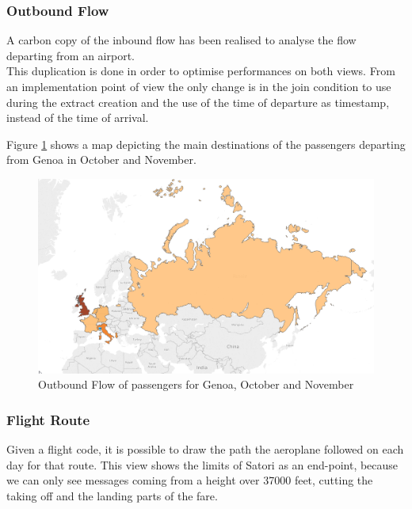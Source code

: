 \subsubsection{Outbound Flow}
A carbon copy of the inbound flow has been realised to analyse the flow departing from an airport.\\
This duplication is done in order to optimise performances on both views. From an implementation point of view the only change is in the join condition to use during the extract creation and the use of the time of departure as timestamp, instead of the time of arrival.

Figure \ref{fig:PassengersViz} shows a map depicting the main destinations of the passengers departing from Genoa in October and November.

\begin{figure}[h]
	\centering
	\includegraphics[width=0.9\linewidth]{Figures/PassengersViz.png}
	\caption{Outbound Flow of passengers for Genoa, October and November}
	\label{fig:PassengersViz}
\end{figure}

\subsubsection{Flight Route}
Given a flight code, it is possible to draw the path the aeroplane followed on each day for that route. This view shows the limits of Satori as an end-point, because we can only see messages coming from a height over 37000 feet, cutting the taking off and the landing parts of the fare.

